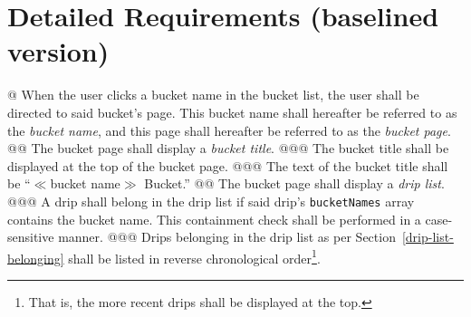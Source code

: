 \documentclass{article}
\begin{document}
\section*{Detailed Requirements (baselined version)}

\begin{easylist}[articletoc]
@ When the user clicks a bucket name in the bucket list, the user shall be directed to said bucket's page. This bucket name shall hereafter be referred to as the \textit{bucket name}, and this page shall hereafter be referred to as the \textit{bucket page}.
@@ The bucket page shall display a \textit{bucket title}.
@@@ The bucket title shall be displayed at the top of the bucket page.
@@@ The text of the bucket title shall be ``$\ll$bucket name$\gg$ Bucket.''
@@ The bucket page shall display a \textit{drip list}.
@@@ \label{drip-list-belonging}A drip shall belong in the drip list if said drip's \texttt{bucketNames} array contains the bucket name. This containment check shall be performed in a case-sensitive manner.
@@@ Drips belonging in the drip list as per Section~\ref{drip-list-belonging} shall be listed in reverse chronological order\footnote{That is, the more recent drips shall be displayed at the top.}.

\end{easylist}
\end{document}
